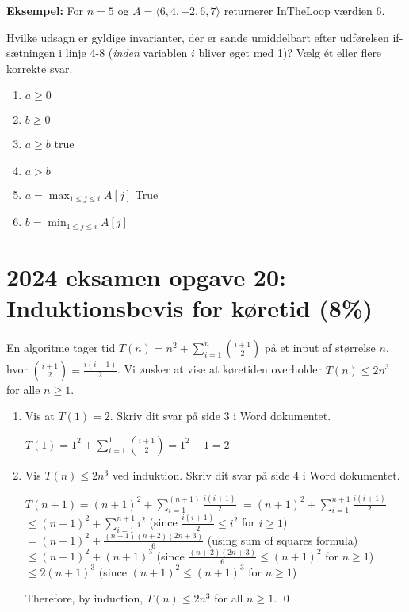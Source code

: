 \documentclass{article}
\theoremstyle{definition}
\begin{document}
\textbf{Eksempel:} For $n = 5$ og $A = \langle 6,4,-2,6,7 \rangle$ returnerer InTheLoop værdien 6.

Hvilke udsagn er gyldige invarianter, der er sande umiddelbart efter udførelsen if-sætningen i linje 4-8 (\emph{inden} variablen $i$ bliver øget med 1)? Vælg ét eller flere korrekte svar.

\begin{enumerate}
    \item $a \geq 0$
    \item $b \geq 0$
    \item $a \geq b$ true
    \item $a > b$
    \item $a = \max_{1 \leq j \leq i} A[j]$ True
    \item $b = \min_{1 \leq j \leq i} A[j]$
\end{enumerate}

\section{2024 eksamen opgave 20: Induktionsbevis for køretid (8\%)}

En algoritme tager tid $T(n) = n^2+\sum_{i=1}^n \binom{i+1}{2}$ på et input af størrelse $n$, hvor $\binom{i+1}{2} = \frac{i(i+1)}{2}$.
Vi ønsker at vise at køretiden overholder $T(n) \leq 2n^3$ for alle $n \geq 1$.

\begin{enumerate}
    \item Vis at $T(1) = 2$. Skriv dit svar på side 3 i Word dokumentet.
    
    $T(1) = 1^2 + \sum_{i=1}^1 \binom{i+1}{2} = 1^2 + 1 = 2$
    
    \item Vis $T(n) \leq 2n^3$ ved induktion. Skriv dit svar på side 4 i Word dokumentet.
    
    $T(n+1) = (n+1)^2+\sum_{i=1}^{(n+1)} \frac{i(i+1)}{2}$
    $= (n+1)^2 + \sum_{i=1}^{n+1} \frac{i(i+1)}{2}$
    $\leq (n+1)^2 + \sum_{i=1}^{n+1} i^2$ (since $\frac{i(i+1)}{2} \leq i^2$ for $i \geq 1$)
    $= (n+1)^2 + \frac{(n+1)(n+2)(2n+3)}{6}$ (using sum of squares formula)
    $\leq (n+1)^2 + (n+1)^3$ (since $\frac{(n+2)(2n+3)}{6} \leq (n+1)^2$ for $n \geq 1$)
    $\leq 2(n+1)^3$ (since $(n+1)^2 \leq (n+1)^3$ for $n \geq 1$)

    Therefore, by induction, $T(n) \leq 2n^3$ for all $n \geq 1$. \qed
\end{enumerate}
\end{document}
